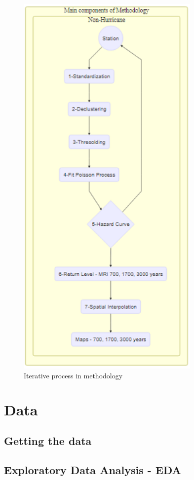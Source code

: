 \documentclass[12pt,oneside]{reedthesis}
\begin{document}
\footnotesize
\begin{figure}
\includegraphics[width=3.51in]{figure/main_methodology} \caption{Iterative process in methodology}\label{fig:mainmethodology}
\end{figure}
\normalsize

\hypertarget{data}{%
\section{Data}\label{data}}

\hypertarget{getting-the-data}{%
\subsection{Getting the data}\label{getting-the-data}}

\hypertarget{exploratory-data-analysis---eda}{%
\subsection{Exploratory Data Analysis - EDA}\label{exploratory-data-analysis---eda}}
\end{document}

